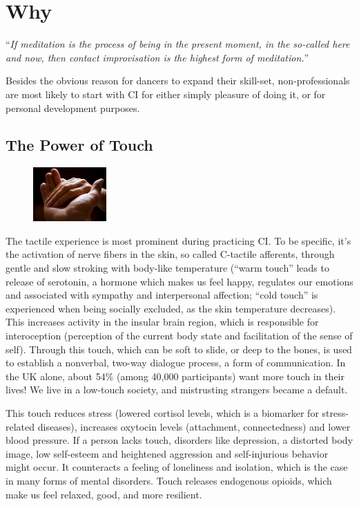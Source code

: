 \section{Why}\label{sec:why}

``\textit{If meditation is the process of being in the present moment, in the so-called here and now, then contact improvisation is the highest form of meditation.}''

Besides the obvious reason for dancers to expand their skill-set, non-professionals are most likely to start with CI for either simply pleasure of doing it, or for personal development purposes.

\subsection{The Power of Touch}\label{subsec:the-power-of-touch}

\begin{figure}
\centering
\includegraphics[width=0.25\textwidth]{images/why}
\end{figure}

The tactile experience is most prominent during practicing CI. To be specific, it's the activation of nerve fibers in the skin, so called C-tactile afferents, through gentle and slow stroking with body-like temperature (``warm touch'' leads to release of serotonin, a hormone which makes us feel happy, regulates our emotions and associated with sympathy and interpersonal affection; ``cold touch'' is experienced when being socially excluded, as the skin temperature decreases).
This increases activity in the insular brain region, which is responsible for interoception (perception of the current body state and facilitation of the sense of self).
Through this touch, which can be soft to slide, or deep to the bones, is used to establish a nonverbal, two-way dialogue process, a form of communication.
In the UK alone, about 54\% (among 40,000 participants) want more touch in their lives!
We live in a low-touch society, and mistrusting strangers became a default.

This touch reduces stress (lowered cortisol levels, which is a biomarker for stress-related diseases), increases oxytocin levels (attachment, connectedness) and lower blood pressure.
If a person lacks touch, disorders like depression, a distorted body image, low self-esteem and heightened aggression and self-injurious behavior might occur.
It counteracts a feeling of loneliness and isolation, which is the case in many forms of mental disorders.
Touch releases endogenous opioids, which make us feel relaxed, good, and more resilient.

